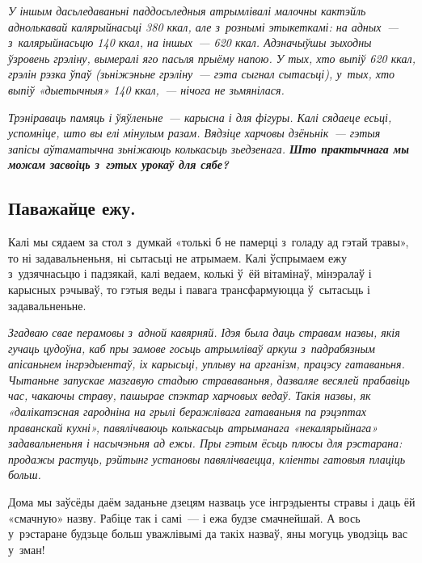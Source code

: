 
\emph{У іншым дасьледаваньні паддосьледныя атрымлівалі малочны кактэйль аднолькавай калярыйнасьці 380 ккал, але з~рознымі этыкеткамі: на адных~--- з~калярыйнасьцю 140 ккал, на іншых~--- 620 ккал. Адзначыўшы зыходны ўзровень грэліну, вымералі яго пасьля прыёму напою. У тых, хто выпіў 620 ккал, грэлін рэзка ўпаў (зьніжэньне грэліну~--- гэта сыгнал сытасьці), у~тых, хто выпіў «дыетычныя» 140 ккал,~--- нічога не зьмянілася.}

\emph{Трэніраваць памяць і ўяўленьне~--- карысна і для фігуры. Калі сядаеце есьці, успомніце, што вы елі мінулым разам. Вядзіце харчовы дзёньнік~--- гэтыя запісы аўтаматычна зьніжаюць колькасьць зьедзенага. \textbf{Што практычнага мы можам засвоіць з~гэтых урокаў для сябе?}}

\subsection*{Паважайце ежу.}
Калі мы сядаем за стол з~думкай «толькі б не памерці з~голаду ад гэтай травы», то ні задавальненьня, ні сытасьці не атрымаем. Калі ўспрымаем ежу з~удзячнасьцю і падзякай, калі ведаем, колькі ў~ёй вітамінаў, мінэралаў і карысных рэчываў, то гэтыя веды і павага трансфармуюцца ў~сытасьць і задавальненьне. 


\emph{Згадваю свае перамовы з~адной кавярняй. Ідэя была даць стравам назвы, якія гучаць цудоўна, каб пры замове госьць атрымліваў аркуш з~падрабязным апісаньнем інгрэдыентаў, іх карысьці, уплыву на арганізм, працэсу гатаваньня. Чытаньне запускае мазгавую стадыю страваваньня, дазваляе весялей прабавіць час, чакаючы страву, пашырае спэктар харчовых ведаў. Такія назвы, як «далікатэсная гародніна на грылі беражлівага гатаваньня па рэцэптах праванскай кухні», павялічваюць колькасьць атрыманага «некалярыйнага» задавальненьня і насычэньня ад ежы. Пры гэтым ёсьць плюсы для рэстарана: продажы растуць, рэйтынг установы павялічваецца, кліенты гатовыя плаціць больш.}

Дома мы заўсёды даём заданьне дзецям назваць усе інгрэдыенты стравы і даць ёй «смачную» назву. Рабіце так і самі~--- і ежа будзе смачнейшай. А вось у~рэстаране будзьце больш уважлівымі да такіх назваў, яны могуць уводзіць вас у~зман!

